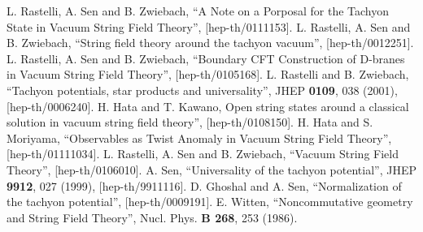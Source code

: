 \documentclass[a4paper,12pt]{article}
\begin{document}
\begin{thebibliography}{99}
 L. Rastelli, A. Sen and B. Zwiebach, ``A Note on a Porposal
for the Tachyon State in Vacuum String Field Theory'', [hep-th/0111153].
 L. Rastelli, A. Sen and B. Zwiebach, ``String field theory
around the tachyon vacuum'', [hep-th/0012251].
 L. Rastelli, A. Sen and B. Zwiebach, ``Boundary CFT
Construction of D-branes in Vacuum String Field Theory'', [hep-th/0105168].
 L. Rastelli and B. Zwiebach, ``Tachyon potentials, star
products and universality'', JHEP {\bf 0109}, 038 (2001),
[hep-th/0006240].
 H. Hata and T. Kawano, Open string states around a classical
solution in vacuum string field theory'', [hep-th/0108150].
 H. Hata and S. Moriyama, ``Observables as Twist Anomaly
in Vacuum String Field Theory'', [hep-th/01111034].
 L. Rastelli, A. Sen and B. Zwiebach,
``Vacuum String Field Theory'', [hep-th/0106010].
 A. Sen, ``Universality of the tachyon potential'',
JHEP {\bf 9912}, 027 (1999), [hep-th/9911116].
 D. Ghoshal and A. Sen, ``Normalization of the tachyon
potential'', [hep-th/0009191].
 E. Witten, ``Noncommutative geometry and String Field Theory'',
Nucl. Phys. {\bf B 268}, 253 (1986).
\end{thebibliography}
\end{document}
